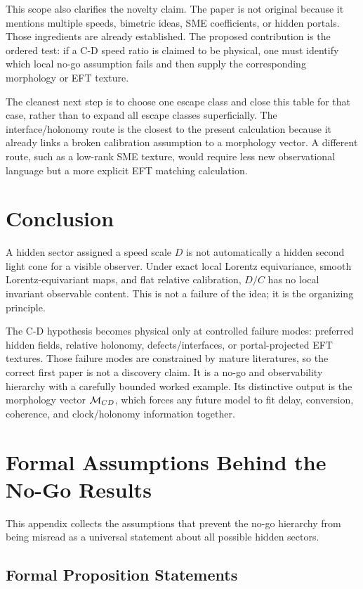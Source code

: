 \documentclass[11pt]{article}
\begin{document}
This scope also clarifies the novelty claim. The paper is not original because it mentions multiple speeds, bimetric ideas, SME coefficients, or hidden portals. Those ingredients are already established. The proposed contribution is the ordered test: if a C-D speed ratio is claimed to be physical, one must identify which local no-go assumption fails and then supply the corresponding morphology or EFT texture.


The cleanest next step is to choose one escape class and close this table for that case, rather than to expand all escape classes superficially. The interface/holonomy route is the closest to the present calculation because it already links a broken calibration assumption to a morphology vector. A different route, such as a low-rank SME texture, would require less new observational language but a more explicit EFT matching calculation.


\section{Conclusion}


A hidden sector assigned a speed scale \(D\) is not automatically a hidden second light cone for a visible observer. Under exact local Lorentz equivariance, smooth Lorentz-equivariant maps, and flat relative calibration, \(D/C\) has no local invariant observable content. This is not a failure of the idea; it is the organizing principle.


The C-D hypothesis becomes physical only at controlled failure modes: preferred hidden fields, relative holonomy, defects/interfaces, or portal-projected EFT textures. Those failure modes are constrained by mature literatures, so the correct first paper is not a discovery claim. It is a no-go and observability hierarchy with a carefully bounded worked example. Its distinctive output is the morphology vector \({\cal M}_{CD}\), which forces any future model to fit delay, conversion, coherence, and clock/holonomy information together.


\appendix
\section{Formal Assumptions Behind the No-Go Results}


This appendix collects the assumptions that prevent the no-go hierarchy from being misread as a universal statement about all possible hidden sectors.


\subsection{Formal Proposition Statements}
\end{document}
